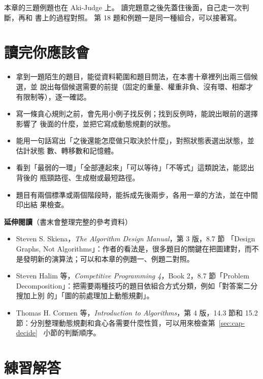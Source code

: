 本章的三題例題也在 Aki-Judge 上。 讀完題意之後先蓋住後面，自己走一次判斷，再和
書上的過程對照。 第 18 題和例題一是同一種組合，可以接著寫。

\section{讀完你應該會}
\label{sec:cap-checklist}

\begin{itemize}
\item 拿到一題陌生的題目，能從資料範圍和題目問法，在本書十章裡列出兩三個候選，並
說出每個候選需要的前提（固定的重量、權重非負、沒有環、相鄰才有限制等），逐一確認。
\item 寫一條貪心規則之前，會先用小例子找反例；找到反例時，能說出眼前的選擇影響了
後面的什麼，並把它寫成動態規劃的狀態。
\item 能用一句話寫出「之後還能怎麼做只取決於什麼」，對照狀態表選出狀態，並估計狀態
數、轉移數和記憶體。
\item 看到「最弱的一環」「全部連起來」「可以等待」「不等式」這類說法，能認出背後的
瓶頸路徑、生成樹或最短路徑。
\item 題目有兩個標準或兩個階段時，能拆成先後兩步，各用一章的方法，並在中間印出結
果檢查。
\end{itemize}

\textbf{延伸閱讀}（書末會整理完整的參考資料）

\begin{itemize}
\item Steven S. Skiena，\textit{The Algorithm Design Manual}，第 3 版，8.7 節
「Design Graphs, Not Algorithms」：作者的看法是，很多題目的關鍵在把圖建對，而不
是發明新的演算法；可以和本章的例題一、例題二對照。
\item Steven Halim 等，\textit{Competitive Programming 4}，Book 2，8.7 節「Problem
Decomposition」：把需要兩種技巧的題目依組合方式分類，例如「對答案二分搜加上別
的」「圖的前處理加上動態規劃」。
\item Thomas H. Cormen 等，\textit{Introduction to Algorithms}，第 4 版，14.3 節和
15.2 節：分別整理動態規劃和貪心各需要什麼性質，可以用來檢查第~\ref{sec:cap-decide}
~小節的判斷順序。
\end{itemize}

\section*{練習解答}

